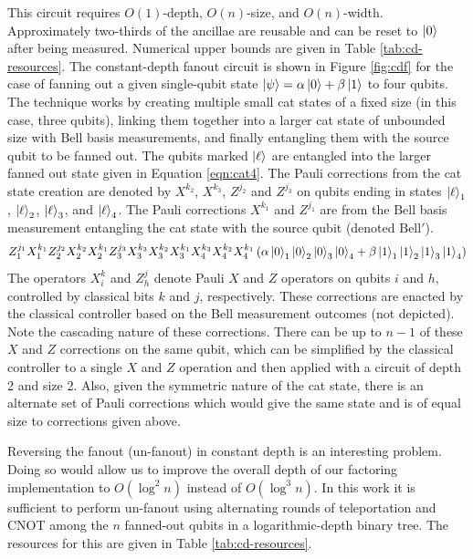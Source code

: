 This circuit requires $O(1)$-depth, $O(n)$-size, and $O(n)$-width. Approximately
two-thirds of the ancillae are reusable and can be reset to $\left\vert{0}\right\rangle$ after
being measured. Numerical upper bounds are given in Table \ref{tab:cd-resources}.
The constant-depth fanout circuit is shown in Figure \ref{fig:cdf} for the case of fanning out a given single-qubit state
$\left\vert{\psi}\right\rangle = \alpha\left\vert{0}\right\rangle + \beta\left\vert{1}\right\rangle$ to four qubits.
The technique works by creating multiple small
cat states of a fixed size (in this case, three qubits), linking them
together into a larger cat state of unbounded size with Bell basis measurements,
and finally entangling them with the source qubit to be fanned out.
The qubits marked $\left\vert{\ell}\right\rangle$ are
entangled into the larger fanned out state given in Equation \ref{eqn:cat4}.
The Pauli corrections from the cat state creation are denoted by
$X^{k_2}$, $X^{k_3}$, $Z^{j_2}$ and $Z^{j_3}$ on qubits ending in
states $\left\vert{\ell}\right\rangle_1$, $\left\vert{\ell}\right\rangle_2$,
$\left\vert{\ell}\right\rangle_3$, and $\left\vert{\ell}\right\rangle_4$. The Pauli corrections
$X^{k_1}$ and $Z^{j_1}$ are from the Bell basis measurement
entangling the cat state with the source qubit (denoted $\text{Bell}'$).
\begin{equation}
Z_1^{j_1}X_1^{k_1}Z_2^{j_2}X_2^{k_2}X_2^{k_1}Z_{3}^{j_3}X_{3}^{k_3}X_{3}^{k_2}X_{3}^{k_1}X_{4}^{k_3}X_{4}^{k_2}X_{4}^{k_1}
\left(\alpha \left\vert{0}\right\rangle_1\left\vert{0}\right\rangle_2\left\vert{0}\right\rangle_3\left\vert{0}\right\rangle_4 + \beta \left\vert{1}\right\rangle_1\left\vert{1}\right\rangle_2\left\vert{1}\right\rangle_3\left\vert{1}\right\rangle_4 \right)
\label{eqn:cat4}
\end{equation}
%
The operators $X^k_i$ and $Z^j_{h}$ denote Pauli $X$ and $Z$ operators
on qubits $i$ and $h$, controlled by classical bits $k$ and $j$,
respectively. These corrections are enacted by the classical controller based on
the Bell measurement outcomes (not depicted).
Note the cascading nature of these corrections.
There can be up to
$n-1$ of these $X$ and $Z$
corrections on the same qubit, which can be simplified by the classical
controller to a single $X$ and $Z$ operation and then applied with a circuit of
depth 2 and size 2. Also, given the symmetric nature of the cat state, there
is an alternate set of Pauli corrections which would give the same state and
is of equal size to corrections given above.

Reversing the fanout (un-fanout) in constant depth is an interesting
problem. Doing so would allow us to improve the overall depth of our
factoring implementation to $O(\log^2 n)$ instead of $O(\log^3 n )$.
In this work it is sufficient to perform un-fanout using alternating rounds of
teleportation and CNOT among the $n$ fanned-out qubits in a logarithmic-depth
binary tree. The resources for this are given in
Table \ref{tab:cd-resources}.

